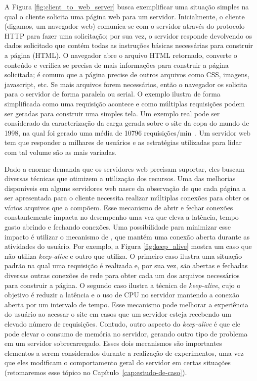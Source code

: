A Figura \ref{fig:client_to_web_server} busca exemplificar uma situação simples
na qual o cliente solicita uma página web para um servidor. Inicialmente, o
cliente (digamos, um navegador web) comunica-se com o servidor através do
protocolo HTTP para fazer uma solicitação; por sua vez, o servidor responde
devolvendo os dados solicitado que contém todas as instruções básicas
necessárias para construir a página (HTML). O navegador abre o arquivo HTML
retornado, converte o conteúdo e verifica se precisa de mais informações para
construir a página solicitada; é comum que a página precise de outros arquivos
como CSS, imagens, javascript, etc. Se mais arquivos forem necessários, então o
navegador os solicita para o servidor de forma paralela ou serial. O exemplo
ilustra de forma simplificada como uma requisição acontece e como múltiplas
requisições podem ser geradas para construir uma simples tela. Um exemplo real
pode ser considerado da caracterização da carga gerada sobre o site da copa do
mundo de 1998, na qual foi gerado uma média de 10796
requisições/min~\citep{worldcup}.  Um servidor web tem que responder a milhares
de usuários e as estratégias utilizadas para lidar com tal volume são as mais
variadas.

Dado a enorme demanda que os servidores web precisam suportar, eles buscam
diversas técnicas que otimizem a utilização dos recursos. Uma das melhorias
disponíveis em alguns servidores web nasce da observação de que cada página a
ser apresentada para o cliente necessita realizar múltiplas conexões para obter
os vários arquivos que a compõem. Esse mecanismo de abrir e fechar
conexões constantemente impacta no desempenho uma vez que eleva a latência,
tempo gasto abrindo e fechando conexões. Uma possibilidade para minimizar esse
impacto é utilizar o mecanismo de , que mantém uma
conexão aberta durante as atividades do usuário. Por exemplo, a Figura
\ref{fig:keep_alive} mostra um caso que não utiliza \emph{keep-alive} e outro
que utiliza. O primeiro caso ilustra uma situação padrão na qual uma requisição
é realizada e, por sua vez, são abertas e fechadas diversas outras conexões de
rede para obter cada um dos arquivos necessários para construir a página. O
segundo caso ilustra a técnica de \emph{keep-alive}, cujo o objetivo é reduzir
a latência e o uso de CPU no servidor mantendo a conexão aberta por um
intervalo de tempo.  Esse mecanismo pode melhorar a experiência do usuário ao
acessar o site em casos que um servidor esteja recebendo um elevado número de
requisições. Contudo, outro aspecto do \emph{keep-alive} é que ele pode elevar
o consumo de memória no servidor, gerando outro tipo de problema em um servidor
sobrecarregado. Esses dois mecanismos são importantes elementos a serem
considerados durante a realização de experimentos, uma vez que eles modificam o
comportamento geral do servidor em certas situações (retomaremos esse tópico no
Capítulo~\ref{cap:estudo-de-caso}).

